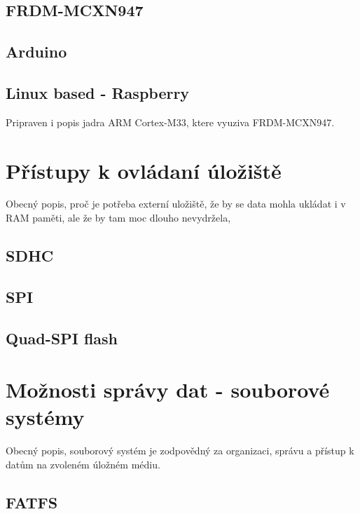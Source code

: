 \subsection{FRDM-MCXN947}

\subsection{Arduino}

\subsection{Linux based - Raspberry}

Pripraven i popis jadra ARM Cortex-M33, ktere vyuziva FRDM-MCXN947.

\section{Přístupy k ovládaní úložiště}
Obecný popis, proč je potřeba externí uložiště, že by se data mohla ukládat i v RAM paměti, ale že by tam moc dlouho nevydržela, 

\subsection{SDHC}

\subsection{SPI}

\subsection{Quad-SPI flash}


\section{Možnosti správy dat - souborové systémy} 
Obecný popis, souborový systém je zodpovědný za organizaci, správu a přístup k datům na zvoleném úložném médiu.

\subsection{FATFS}

